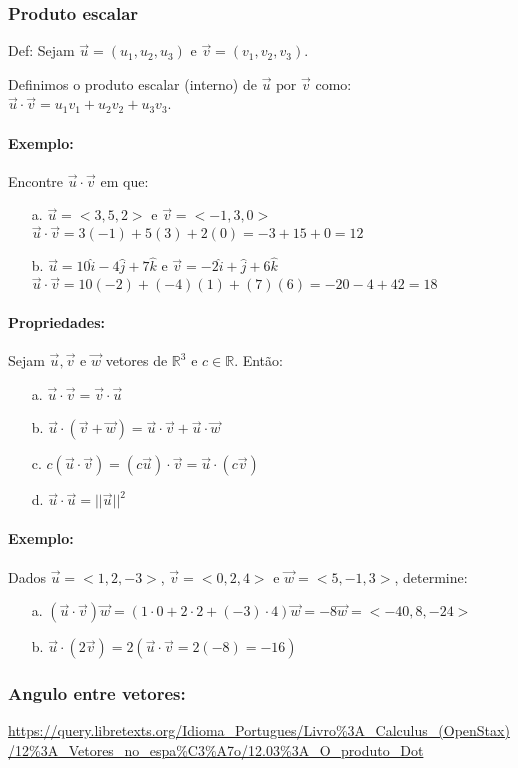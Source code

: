 

\subsubsection{Produto escalar}

Def: Sejam $\vec{u} = (u_1, u_2, u_3)$ e $\vec{v} = (v_1, v_2, v_3)$. 


Definimos o produto escalar (interno) de $\vec{u} \text{ por } \vec{v}$ como:
$\vec{u} \cdot \vec{v} = u_1v_1 + u_2v_2 + u_3v_3$.

\paragraph{Exemplo:} Encontre $\vec{u} \cdot \vec{v}$ em que:
\begin{itemize}
    \item[a.] $\vec{u} = <3,5,2>$ e $\vec{v} = <-1,3,0>$ \\
            $\vec{u} \cdot \vec{v} = 3(-1) + 5(3) + 2(0) = -3 +15 + 0 = 12$
    \item[b. ]  $\vec{u} = 10 \hat{i} - 4 \hat{j} + 7 \hat{k}$ e $\vec{v} = -2 \hat{i} + \hat{j} + 6 \hat{k}$ \\
            $\vec{u} \cdot \vec{v} = 10(-2) + (-4)(1) + (7)(6) = -20 -4 + 42 = 18$
\end{itemize}

\paragraph{Propriedades:} Sejam $\vec{u}, \vec{v} \text{ e } \vec{w}$ vetores de $\mathbb{R}^3$ e $c \in \mathbb{R}$. Então:
\begin{itemize}
    \item[a. ] $\vec{u} \cdot \vec{v} = \vec{v} \cdot \vec{u}$
    \item[b. ] $\vec{u} \cdot (\vec{v} + \vec{w}) = \vec{u} \cdot\vec{v} + \vec{u} \cdot \vec{w} $
    \item[c. ] $ c (\vec{u} \cdot \vec{v}) = (c \vec{u}) \cdot \vec{v} = \vec{u} \cdot (c \vec{v}) $   
    \item[d. ] $\vec{u} \cdot \vec{u} = ||\vec{u}||^2$ 
\end{itemize}
    
\paragraph{Exemplo:} Dados $\vec{u} = <1,2,-3>$, $\vec{v} = <0,2,4> \text{ e } \vec{w} = <5, -1, 3>$, determine:
\begin{itemize}
    \item[a. ] $(\vec{u} \cdot \vec{v}) \vec{w} = (1 \cdot 0 + 2 \cdot 2 + (-3) \cdot 4) \vec{w} = -8 \vec{w} = <-40,8,-24>$
    \item[b. ] $\vec{u} \cdot (2 \vec{v}) = 2 (\vec{u} \cdot \vec{v} = 2 (-8) = -16)$  
\end{itemize}

\subsubsection{Angulo entre vetores:}
\url{https://query.libretexts.org/Idioma_Portugues/Livro%3A_Calculus_(OpenStax)/12%3A_Vetores_no_espa%C3%A7o/12.03%3A_O_produto_Dot}